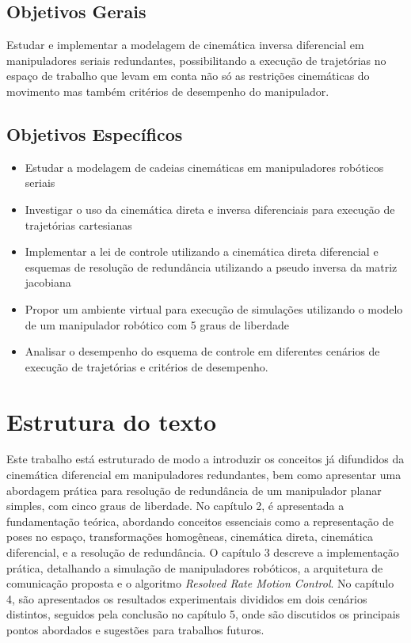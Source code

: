\subsection{Objetivos Gerais}

Estudar e implementar a modelagem de cinemática inversa diferencial em manipuladores seriais redundantes, possibilitando a execução de
trajetórias no espaço de trabalho que levam em conta não só as restrições cinemáticas do movimento mas também critérios
de desempenho do manipulador.

\subsection{Objetivos Específicos}
\begin{itemize}
	\item Estudar a modelagem de cadeias cinemáticas em manipuladores robóticos seriais
	\item Investigar o uso da cinemática direta e inversa diferenciais para execução de trajetórias cartesianas
	\item Implementar a lei de controle utilizando a cinemática direta diferencial e esquemas de resolução de redundância utilizando a pseudo inversa da matriz jacobiana
	\item Propor um ambiente virtual para execução de simulações utilizando o modelo de um manipulador robótico com 5 graus de liberdade
	\item Analisar o desempenho do esquema de controle em diferentes cenários de execução de trajetórias e critérios de desempenho.
\end{itemize}

\section{Estrutura do texto}\label{sec:structure}

Este trabalho está estruturado de modo a introduzir os conceitos já difundidos da cinemática diferencial em manipuladores redundantes,
bem como apresentar uma abordagem prática para resolução de redundância de um manipulador planar simples, com cinco graus de liberdade.
No capítulo 2, é apresentada a fundamentação teórica, abordando conceitos essenciais como a representação de poses no
espaço, transformações homogêneas, cinemática direta, cinemática diferencial, e a resolução de redundância.
O capítulo 3 descreve a implementação prática, detalhando a simulação de manipuladores robóticos, a arquitetura de comunicação proposta
e o algoritmo \emph{Resolved Rate Motion Control}. No capítulo 4, são apresentados os resultados experimentais divididos em dois cenários
distintos, seguidos pela conclusão no capítulo 5, onde são discutidos os principais pontos abordados e sugestões para trabalhos futuros.
